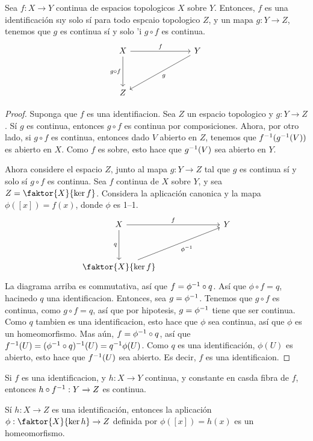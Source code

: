 \begin{theorem}\label{thm_8.15}
    Sea $f:X \xrightarrow{} Y$ continua de espacios topologicos $X$ sobre  $Y$.
    Entonces, $f$ es una identificaci\'on s\i y solo s\'i para todo espcaio
    topologico $Z$, y un mapa $g: Y \xrightarrow{} Z$, tenemos que $g$ es
    continua s\'i y solo \s'i  $g \circ f$ es continua.
    \[\begin{tikzcd}
        X &&& Y \\
        \\
        Z
        \arrow["f", from=1-1, to=1-4]
        \arrow["g", from=1-4, to=3-1]
        \arrow["{g \circ f}"', from=1-1, to=3-1]
    \end{tikzcd}\]
\end{theorem}
\begin{proof}
    Suponga que $f$ es una identifiacion. Sea  $Z$ un espacio topologico y $g:Y
    \xrightarrow{} Z$. S\'i $g$ es continua, entonces  $g \circ f$ es continua
    por composiciones. Ahora, por otro lado, si  $g \circ f$ es continua,
    entonces dado  $V$ abierto en  $Z$, tenemos que  $f^{-1}(g^{-1}(V))$ es
    abierto en $X$. Como $f$ es sobre, esto hace que  $g^{-1}(V)$ sea abierto
    en $Y$.

    Ahora considere el espacio  $Z$, junto al mapa  $g:Y \xrightarrow{} Z$ tal
    que $g$ es continua s\'i y solo s\'i  $g \circ f$ es continua. Sea  $f$
    continua de  $X$ sobre  $Y$, y sea  $Z=\faktor{X}{\ker{f}}$. Considera la
    aplicaci\'on canonica y la mapa $\phi([x])=f(x)$, donde $\phi$ es 1--1.
    \[\begin{tikzcd}
        X &&& Y \\
        \\
        {\faktor{X}{\ker{f}}}
        \arrow["f", from=1-1, to=1-4]
        \arrow["{\phi^{-1}}"', from=3-1, to=1-4]
        \arrow["q"', from=1-1, to=3-1]
    \end{tikzcd}\]
    La diagrama arriba es commutativa, as\'i que $f=\phi^{-1} \circ q$. As\'i
    que $\phi \circ f=q$, hacinedo  $q$ una identificacion. Entonces, sea
    $g=\phi^{-1}$. Tenemos que $g \circ f$ es continua, como  $g \circ f=q$,
    as\'i que por hipotesis,  $g=\phi^{-1}$ tiene que ser continua. Como $q$
    tambien es una identificacion, esto hace que  $\phi$ sea continua, as\'i que
     $\phi$ es un homeomorfismo. Mas a\'un,  $f=\phi^{-1} \circ q$, as\'i que
     $f^{-1}(U)=(\phi^{-1} \circ q)^{-1}(U)=q^{-1}\phi(U)$. Como $q$ es una
     identificaci\'on,  $\phi(U)$ es abierto, esto hace que $f^{-1}(U)$ sea
     abierto. Es decir, $f$ es una identificaion.
\end{proof}
\begin{corollary}
    Si $f$ es una identificacion, y  $h:X \xrightarrow{} Y$ continua, y
    constante en casda fibra de $f$, entonces  $h \circ f^{-1}:Y \xrightarrow{}
    Z$ es continua.
\end{corollary}
\begin{corollary}
    S\'i $h:X \xrightarrow{} Z$ es una identificaci\'on, entonces la
    aplicaci\'on $\phi:\faktor{X}{\ker{h}} \xrightarrow{} Z$ definida por
    $\phi([x])=h(x)$ es un homeomorfismo.
\end{corollary}

